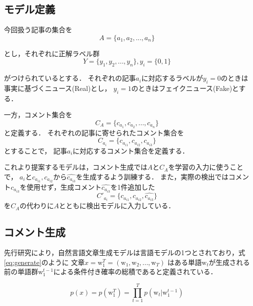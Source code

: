 \subsection{モデル定義}
今回扱う記事の集合を 
\begin{equation}
    A = \{a_1, a_2, ..., a_n\}
\end{equation}

とし，それぞれに正解ラベル群 
\begin{equation}
    Y=\{y_1, y_2, ..., y_n\}, y_i = \{0, 1\}
\end{equation}

がつけられているとする．
それぞれの記事$a_i$に対応するラベルが$y_i=0$のときは事実に基づくニュース(Real)とし，
$y_i=1$のときはフェイクニュース(Fake)とする．

一方，コメント集合を
\begin{equation}
    C_A = \{c_{a_1}, c_{a_2}, ..., c_{a_n}\}
\end{equation}
と定義する．
それぞれの記事に寄せられたコメント集合を
\begin{equation}
    C_{a_i} = \{c_{a_{i1}}, c_{a_{i2}}, c_{a_{i3}}\}
\end{equation}
とすることで，
記事$a_i$に対応するコメント集合を定義する．

これより提案するモデルは，コメント生成では$A$と$C_A$を学習の入力に使うことで，
$a_i$と$c_{a_{i1}}, c_{a_{i2}}$から$\hat{c_{a_{i3}}}$を生成するよう訓練する．
また，実際の検出ではコメント$c_{a_{i3}}$を使用せず，生成コメント$\hat{c_{a_{i3}}}$を1件追加した
\begin{equation}
    C'_{a_i} = \{ c_{a_{i1}}, c_{a_{i2}}, \hat{c_{a_{i3}}}\}
\end{equation}
を$C_A$の代わりに$A$とともに検出モデルに入力している．


\subsection{コメント生成}
\label{sec:method_generate}
先行研究により，自然言語文章生成モデルは言語モデルの1つとされており，式\ref{eq:generate}のように
文章$x = \mathrm{w}_1^T = (\mathrm{w}_1, \mathrm{w}_2, ..., \mathrm{w}_T)$
はある単語$\mathrm{w}_t$が生成される前の単語群$ \mathrm{w}_1^{t-1}$による条件付き確率の総積であると定義されている．

\begin{equation}
    \label{eq:generate}
    p(x) = p(\mathrm{w}_1^T) = \prod_{t=1}^{T} p(\mathrm{w}_t|\mathrm{w}_1^{t-1})
\end{equation}

